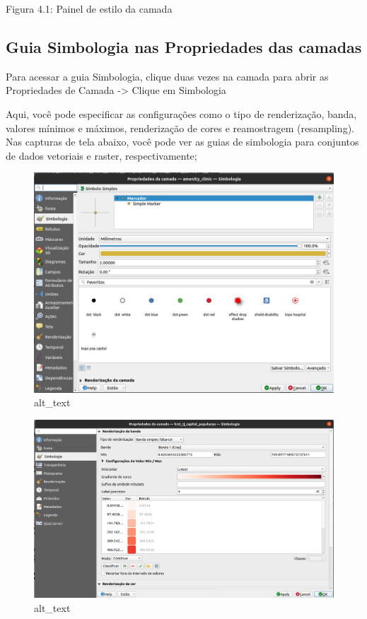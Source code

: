 \documentclass[
  portuguese,
]{krantz}
\begin{document}
Figura 4.1: Painel de estilo da camada

\hypertarget{guia-simbologia-nas-propriedades-das-camadas}{%
\subsection{\texorpdfstring{\textbf{Guia Simbologia nas Propriedades das camadas}}{Guia Simbologia nas Propriedades das camadas}}\label{guia-simbologia-nas-propriedades-das-camadas}}

Para acessar a guia Simbologia, clique duas vezes na camada para abrir as Propriedades de Camada -\textgreater{} Clique em Simbologia

Aqui, você pode especificar as configurações como o tipo de renderização, banda, valores mínimos e máximos, renderização de cores e reamostragem (resampling). Nas capturas de tela abaixo, você pode ver as guias de simbologia para conjuntos de dados vetoriais e raster, respectivamente;

\begin{figure}
\centering
\includegraphics{media/modulo4/style-vector.png}
\caption{alt\_text}
\end{figure}

\begin{figure}
\centering
\includegraphics{media/modulo4/style-raster.png}
\caption{alt\_text}
\end{figure}
\end{document}

